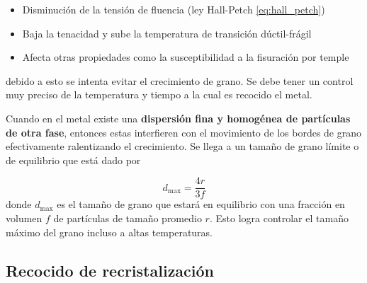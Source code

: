 \begin{itemize}
	\item Disminución de la tensión de fluencia (ley Hall-Petch \eqref{eq:hall_petch})
	\item Baja la tenacidad y sube la temperatura de transición dúctil-frágil
	\item Afecta otras propiedades como la susceptibilidad a la fisuración por temple
\end{itemize}
debido a esto se intenta evitar el crecimiento de grano. Se debe tener un control muy preciso de la temperatura y tiempo a la cual es recocido el metal.

Cuando en el metal existe una \textbf{dispersión fina y homogénea de partículas de otra fase}, entonces estas interfieren con el movimiento de los bordes de grano efectivamente ralentizando el crecimiento. Se llega a un tamaño de grano límite o de equilibrio que está dado por 

\begin{equation}
	d_{\max} = \frac{4 r}{3 f}
\end{equation}
donde $d_{\max}$ es el tamaño de grano que estará en equilibrio con una fracción en volumen $f$ de partículas de tamaño promedio $r$. Esto logra controlar el tamaño máximo del grano incluso a altas temperaturas.


\subsection{Recocido de recristalización}
